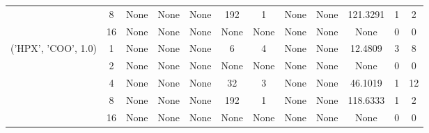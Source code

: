 \begin{tabular}{cccccccccccc}
& 8& None& None& None& 192& 1& None& None& 121.3291& 1& 2\\
& 16& None& None& None& None& None& None& None& None& 0& 0\\
\hline
\multirow{5}{*}{('HPX', 'COO', 1.0)}& 1& None& None& None& 6& 4& None& None& 12.4809& 3& 8\\
& 2& None& None& None& None& None& None& None& None& 0& 0\\
& 4& None& None& None& 32& 3& None& None& 46.1019& 1& 12\\
& 8& None& None& None& 192& 1& None& None& 118.6333& 1& 2\\
& 16& None& None& None& None& None& None& None& None& 0& 0\\
\hline
\end{tabular}



